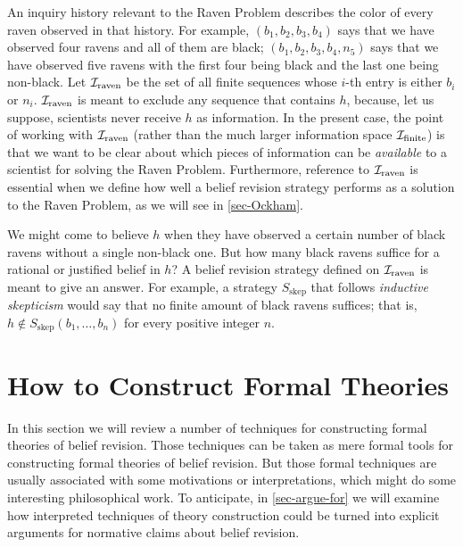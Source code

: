 \ed An inquiry history relevant to the Raven Problem describes the color of every raven observed in that history. For example, $(b_{1}, b_{2}, b_{3}, b_{4})$ says that we have observed four ravens and all of them are black; $(b_{1}, b_{2}, b_{3}, b_{4}, n_5)$ says that we have observed five ravens with the first four being black and the last one being non-black. Let ${\cal I}_{\textrm{raven}}$ be the set of all finite sequences whose $i$-th entry is either $b_{i}$ or $n_{i}$. ${\cal I}_{\textrm{raven}}$ is meant to exclude any sequence that contains $h$, because, let us suppose, scientists never receive $h$ as information. In the present case, the point of working with ${\cal I}_{\textrm{raven}}$ (rather than the much larger information space ${\cal I}_{\textrm{finite}}$) is that we want to be clear about which pieces of information can be {\em available} to a scientist for solving the Raven Problem. Furthermore, reference to ${\cal I}_{\textrm{raven}}$ is essential when we define how well a belief revision strategy performs as a solution to the Raven Problem, as we will see in \autoref{sec-Ockham}.

We might come to believe $h$ when they have observed a certain number of black ravens without a single non-black one. But how many black ravens suffice for a rational or justified belief in $h$? A belief revision strategy defined on ${\cal I}_{\textrm{raven}}$ is meant to give an answer. For example, a strategy $S_{\textrm{skep}}$ that follows {\em inductive skepticism} would say that no finite amount of black ravens suffices; that is, $h \not\in S_{\textrm{skep}}(b_1, \ldots, b_n)$ for every positive integer $n$.



\section{How to Construct Formal Theories}\label{sec-how-to-construct}

In this section we will review a number of techniques for constructing formal theories of belief revision. Those techniques can be taken as mere formal tools for constructing formal theories of belief revision. But those formal techniques are usually associated with some motivations or interpretations, which might do some interesting philosophical work. To anticipate, in \autoref{sec-argue-for} we will examine how interpreted techniques of theory construction could be turned into explicit arguments for normative claims about belief revision.


